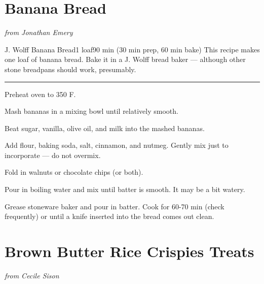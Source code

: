 \documentclass[openany]{book}
\begin{document}
\chapter{Banana Bread}\label{banana-bread}

\emph{from Jonathan Emery}

\begin{recipe}[BananaBread]{J. Wolff Banana Bread}{1 loaf}{90 min (30 min prep, 60 min bake)}
\freeform This recipe makes one loaf of banana bread. Bake it in a J. Wolff bread baker --- although other stone breadpans should work, presumably.
\freeform\rule{\textwidth}{0.05pt}

\newstep Preheat oven to 350 \degrees F.

Mash bananas in a mixing bowl until relatively smooth.


Beat sugar, vanilla, olive oil, and milk into the mashed bananas.


Add flour, baking soda, salt, cinnamon, and nutmeg. Gently mix just to incorporate --- do not overmix.


Fold in walnuts or chocolate chips (or both).


Pour in boiling water and mix until batter is smooth. It may be a bit watery.

\newstep

Grease stoneware baker and pour in batter. Cook for 60-70 min (check frequently) or until a knife inserted into the bread comes out clean.
\end{recipe}

\chapter{Brown Butter Rice Crispies
Treats}\label{brown-butter-rice-crispies-treats}

\emph{from Cecile Sison}
\end{document}
